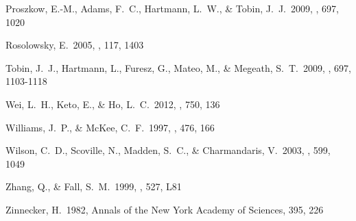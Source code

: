 \begin{thebibliography}
 Proszkow, E.-M., Adams, F.~C., Hartmann, L.~W., \& Tobin, J.~J.\ 2009, \apj, 697, 1020 


 Rosolowsky, E.\ 2005, 
\pasp, 117, 1403







 Tobin, J.~J., Hartmann, L., Furesz, G., Mateo, M., \& Megeath, S.~T.\ 2009, \apj, 697, 1103-1118 

 Wei, L.~H., Keto, E., 
\& Ho, L.~C.\ 2012, \apj, 750, 136

 Williams, J.~P., \& McKee, C.~F.\ 1997, \apj, 476, 166 


 Wilson, C.~D., Scoville, 
N., Madden, S.~C., \& Charmandaris, V.\ 2003, \apj, 599, 1049 


 Zhang, Q., \& Fall, S.~M.\ 1999, \apjl, 527, L81 

 Zinnecker, H.\ 1982, Annals 
of the New York Academy of Sciences, 395, 226 



\end{thebibliography}
